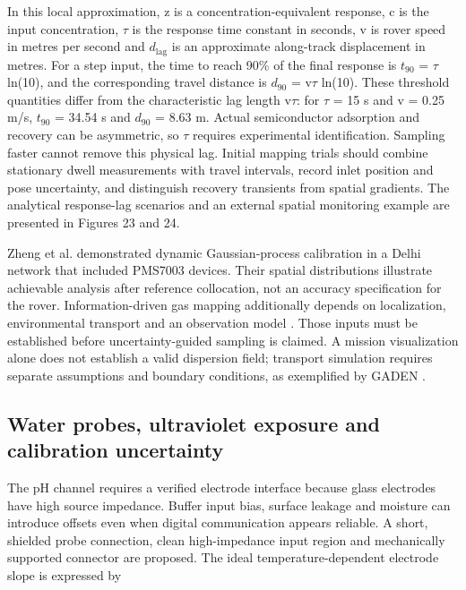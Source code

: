\documentclass[11pt,a4paper]{article}
\begin{document}
In this local approximation, z is a concentration-equivalent response, c is the input concentration, \(\tau\) is the response time constant in seconds, v is rover speed in metres per second and \(d_{\mathrm{lag}}\) is an approximate along-track displacement in metres. For a step input, the time to reach 90\% of the final response is \(t_{90}\) = \(\tau\) ln(10), and the corresponding travel distance is \(d_{90}\) = v\(\tau\) ln(10). These threshold quantities differ from the characteristic lag length v\(\tau\): for \(\tau\) = 15 s and v = 0.25 m/s, \(t_{90}\) = 34.54 s and \(d_{90}\) = 8.63 m. Actual semiconductor adsorption and recovery can be asymmetric, so \(\tau\) requires experimental identification. Sampling faster cannot remove this physical lag. Initial mapping trials should combine stationary dwell measurements with travel intervals, record inlet position and pose uncertainty, and distinguish recovery transients from spatial gradients. The analytical response-lag scenarios and an external spatial monitoring example are presented in Figures 23 and 24.

Zheng et al. \citep{zheng2019_9520c4} demonstrated dynamic Gaussian-process calibration in a Delhi network that included PMS7003 devices. Their spatial distributions illustrate achievable analysis after reference collocation, not an accuracy specification for the rover. Information-driven gas mapping additionally depends on localization, environmental transport and an observation model \citep{gongora2023_ca6a1d}. Those inputs must be established before uncertainty-guided sampling is claimed. A mission visualization alone does not establish a valid dispersion field; transport simulation requires separate assumptions and boundary conditions, as exemplified by GADEN \citep{monroy2017_e93884}.

\FloatBarrier

\subsection{Water probes, ultraviolet exposure and calibration uncertainty}\label{sec:7.5}

The pH channel requires a verified electrode interface because glass electrodes have high source impedance. Buffer input bias, surface leakage and moisture can introduce offsets even when digital communication appears reliable. A short, shielded probe connection, clean high-impedance input region and mechanically supported connector are proposed. The ideal temperature-dependent electrode slope is expressed by
\end{document}
